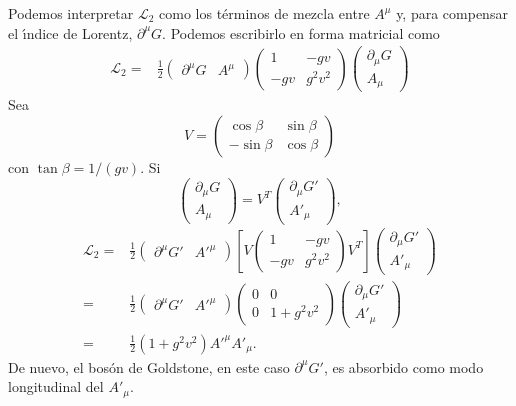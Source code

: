 Podemos interpretar  $\mathcal{L}_2$ como los t\'erminos de mezcla entre $A^\mu$ y, para compensar el \'\i ndice de Lorentz, $\partial^\mu G$. Podemos escribirlo en  forma matricial como
\begin{align}
  \mathcal{L}_2=&\tfrac{1}{2}
  \begin{pmatrix}
    \partial^\mu G & A^\mu    
  \end{pmatrix}
  \begin{pmatrix}
    1   & -gv\\
    -gv & g^2v^2
  \end{pmatrix}
  \begin{pmatrix}
    \partial_\mu G\\
    A_\mu
  \end{pmatrix}
\end{align}
Sea
\begin{equation}
  V=\begin{pmatrix}
    \cos\beta & \sin\beta\\
    -\sin\beta& \cos\beta
  \end{pmatrix}
\end{equation}
con $\tan\beta=1/(gv)$. Si
\begin{equation}
   \begin{pmatrix}
    \partial_\mu G\\
    A_\mu
  \end{pmatrix}=V^T \begin{pmatrix}
    \partial_\mu G'\\
    A'_\mu
  \end{pmatrix},
\end{equation}
\begin{align}
  \mathcal{L}_2=&\tfrac{1}{2}
  \begin{pmatrix}
    \partial^\mu G' & {A'}^\mu    
  \end{pmatrix}\left[V
  \begin{pmatrix}
    1   & -gv\\
    -gv & g^2v^2
  \end{pmatrix}V^T\right]
  \begin{pmatrix}
    \partial_\mu G'\\
    A'_\mu
  \end{pmatrix}\nonumber\\
  =&\tfrac{1}{2}
  \begin{pmatrix}
    \partial^\mu G' & {A'}^\mu    
  \end{pmatrix}
  \begin{pmatrix}
    0   & 0\\
    0 & 1+g^2v^2
  \end{pmatrix}
  \begin{pmatrix}
    \partial_\mu G'\\
    A'_\mu
  \end{pmatrix}\nonumber\\
  =&\tfrac{1}{2}\left(1+g^2v^2\right){A'}^\mu A'_\mu.
\end{align}
De nuevo, el bos\'on de Goldstone, en este caso $\partial^\mu G'$, es absorbido como modo longitudinal del $A'_\mu$.

